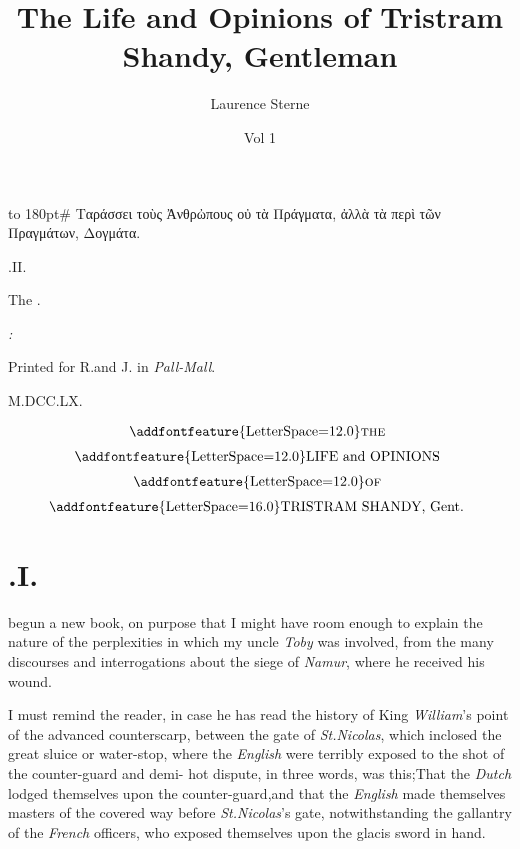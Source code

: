 \documentclass{article}
\title{The Life and Opinions of Tristram Shandy, Gentleman}
\author{Laurence Sterne}
\date{Vol 1}
\begin{document}
\pagestyle{empty}
\vbox{\openup 10pt}
\vfill
\vbox{\openup 2pt\halign to 180pt{\footnotesize #\cr
\quad Ταράσσει τοὺς Ἀνθρὠπους οὐ τὰ Πράγματα,\cr
ἀλλὰ τὰ περὶ τῶν Πραγμάτων, Δογμάτα.\hfill\cr}}
\bigskip
\centerline{.\quad II.}
\vfill
\centerline{The .}
\vfill
\centerline{\itshape{}:}
\centerline{\smaller Printed for R.\@ and J.\@ {} in \textit{Pall-Mall}.}
\centerline{M.DCC.LX.}
\newpage
\null
\newpage
\pagestyle{fancy}
\thispagestyle{empty}
\setcounter{page}{1}
\[\vbox{\openup 6pt\halign{\hss # \hss\cr
\addfontfeature{LetterSpace=12.0}\textsc{the}\cr
\addfontfeature{LetterSpace=12.0}LIFE and OPINIONS\cr
\addfontfeature{LetterSpace=12.0}\textsc{of}\cr
{\addfontfeature{LetterSpace=16.0}TRISTRAM SHANDY}, Gent.\cr}}\]

\vskip 6pt
\setlength{\baselineskip}{14pt}  %

\null
\section{.\enspace  I.}

 begun a new book, on purpose that I might
have room enough to explain the nature of the perplexities in
which my uncle \textit{Toby} was involved, from the many
discourses and interrogations about the siege of \textit{Namur},
where he received his wound.

I must remind the reader, in case he has read the history of
King \textit{William}’s 
point of the advanced counterscarp,
be\-tween the gate of \textit{St.\@ Nicolas}, which inclo\-sed the
great sluice or water-stop, where the \textit{English} were
terribly exposed to the shot of the counter-guard and
demi-\break
{}
hot dispute, in three words, was this;\break That the \textit{Dutch}
lodged themselves upon the counter-guard,\tsk and that the
\textit{English} made themselves masters of the covered way
before \textit{St.\@ Nicolas}'s gate, notwithstanding the gallantry
of the \textit{French} offi\-cers, who exposed themselves upon the\break
glacis sword in hand.
\end{document}
